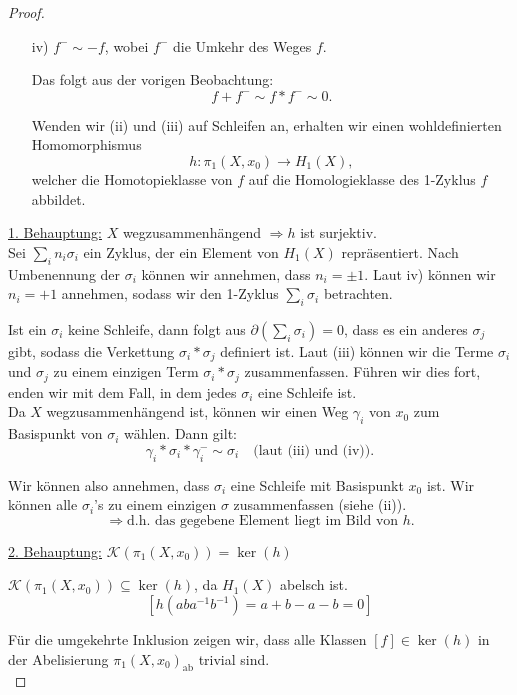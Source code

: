 \documentclass[fleqn, 12pt, letterpaper]{article}
\begin{document}
\begin{proof}
\begin{itemize}
\item[iv)] \quad $f^- \sim -f$, wobei $f^-$ die Umkehr des Weges $f$.

Das folgt aus der vorigen Beobachtung:
\[
f + f^- \sim f * f^- \sim 0.
\]

Wenden wir (ii) und (iii) auf Schleifen an, erhalten wir einen wohldefinierten Homomorphismus
\[
h : \pi_1(X,x_0) \to H_1(X),
\]
welcher die Homotopieklasse von $f$ auf die Homologieklasse des 1-Zyklus $f$ abbildet.

\medskip
\end{itemize}
\underline{1. Behauptung:} $X$ wegzusammenhängend $\Rightarrow h$ ist surjektiv.\\

Sei $\sum_i n_i \sigma_i$ ein Zyklus, der ein Element von $H_1(X)$ repräsentiert.  
Nach Umbenennung der $\sigma_i$ können wir annehmen, dass $n_i = \pm 1$.  
Laut {iv)} können wir $n_i = +1$ annehmen, sodass wir den 1-Zyklus $\sum_i \sigma_i$ betrachten.

Ist ein $\sigma_i$ keine Schleife, dann folgt aus $\partial\left( \sum_i \sigma_i \right) = 0$, 
dass es ein anderes $\sigma_j$ gibt, sodass die Verkettung $\sigma_i * \sigma_j$ definiert ist.
Laut (iii) können wir die Terme $\sigma_i$ und $\sigma_j$ zu einem einzigen Term $\sigma_i * \sigma_j$ 
zusammenfassen. Führen wir dies fort, enden wir mit dem Fall, in dem jedes $\sigma_i$ eine Schleife ist.\\

Da $X$ wegzusammenhängend ist, können wir einen Weg $\gamma_i$ von $x_0$ zum Basispunkt von $\sigma_i$ wählen. 
Dann gilt:
\[
\gamma_i * \sigma_i * \gamma^-_i \sim \sigma_i \quad \text{(laut (iii) und (iv))}.
\]

Wir können also annehmen, dass $\sigma_i$ eine Schleife mit Basispunkt $x_0$ ist.  
Wir können alle $\sigma_i$'s zu einem einzigen $\sigma$ zusammenfassen (siehe (ii)).
\[
\Rightarrow \text{d.h. das gegebene Element liegt im Bild von } h.
\]

\underline{2. Behauptung:} $\mathcal{K}(\pi_1(X,x_0)) = \ker(h)$

\medskip

$\mathcal{K}(\pi_1(X,x_0)) \subseteq \ker(h)$, da $H_1(X)$ abelsch ist.
\[
\left[ h(aba^{-1}b^{-1}) = a + b - a - b = 0 \right]
\]

Für die umgekehrte Inklusion zeigen wir, dass alle Klassen $[f] \in \ker(h)$ in der Abelisierung $\pi_1(X,x_0)_{\text{ab}}$ trivial sind.\\


\end{proof}
\end{document}
